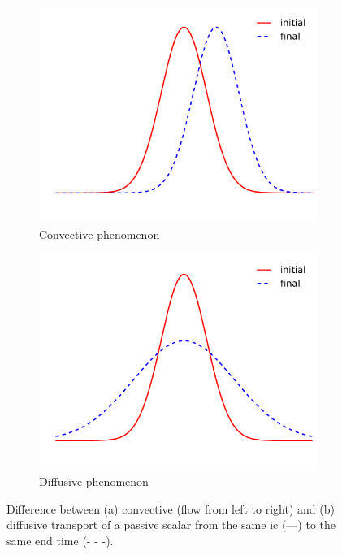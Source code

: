 \begin{figure}[!h]
\centering
\begin{subfigure}{.45\textwidth}
  \centering
  \includegraphics[width=0.9\linewidth]{figs/convective_process.pdf}
  \caption{Convective phenomenon}
\end{subfigure}
\begin{subfigure}{.45\textwidth}
  \centering
  \includegraphics[width=0.9\linewidth]{figs/diffusive_process.pdf}
  \caption{Diffusive phenomenon}
\end{subfigure}
\caption{Difference between (a) convective (flow from left to right) and (b) diffusive transport of a passive scalar from the same \gls{ic} (---) to the same end time (- - -).}
\label{fig:Convection_vs_Diffusion}
\end{figure}

